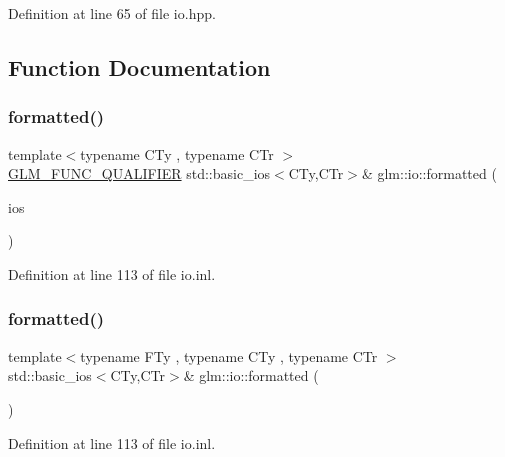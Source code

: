 Definition at line 65 of file io.\+hpp.



\subsection{Function Documentation}
\mbox{\label{namespaceglm_1_1io_a61bbd0ea648623b0b07215a986bd5aa5}} 
\subsubsection{\texorpdfstring{formatted()}{formatted()}\hspace{0.1cm}{\footnotesize\ttfamily [1/2]}}
{\footnotesize\ttfamily template$<$typename C\+Ty , typename C\+Tr $>$ \\
\hyperlink{setup_8hpp_a33fdea6f91c5f834105f7415e2a64407}{G\+L\+M\+\_\+\+F\+U\+N\+C\+\_\+\+Q\+U\+A\+L\+I\+F\+I\+ER} std\+::basic\+\_\+ios$<$C\+Ty,C\+Tr$>$\& glm\+::io\+::formatted (\begin{DoxyParamCaption}\item[{std\+::basic\+\_\+ios$<$ C\+Ty, C\+Tr $>$ \&}]{ios }\end{DoxyParamCaption})}



Definition at line 113 of file io.\+inl.

\mbox{\label{namespaceglm_1_1io_a892800782557e1591ffcf8460578f8a8}} 
\subsubsection{\texorpdfstring{formatted()}{formatted()}\hspace{0.1cm}{\footnotesize\ttfamily [2/2]}}
{\footnotesize\ttfamily template$<$typename F\+Ty , typename C\+Ty , typename C\+Tr $>$ \\
std\+::basic\+\_\+ios$<$C\+Ty,C\+Tr$>$\& glm\+::io\+::formatted (\begin{DoxyParamCaption}\item[{std\+::basic\+\_\+ios$<$ C\+Ty, C\+Tr $>$ \&}]{ }\end{DoxyParamCaption})}



Definition at line 113 of file io.\+inl.

